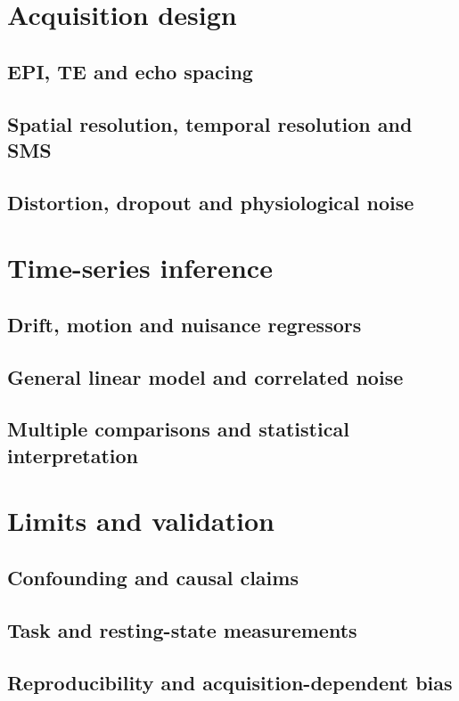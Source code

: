 \section{Acquisition design}
\label{sec:21:acquisition-design}
\subsection{EPI, TE and echo spacing}
\subsection{Spatial resolution, temporal resolution and SMS}
\subsection{Distortion, dropout and physiological noise}

\section{Time-series inference}
\label{sec:21:time-series-inference}
\subsection{Drift, motion and nuisance regressors}
\subsection{General linear model and correlated noise}
\subsection{Multiple comparisons and statistical interpretation}

\section{Limits and validation}
\label{sec:21:limits-and-validation}
\subsection{Confounding and causal claims}
\subsection{Task and resting-state measurements}
\subsection{Reproducibility and acquisition-dependent bias}

